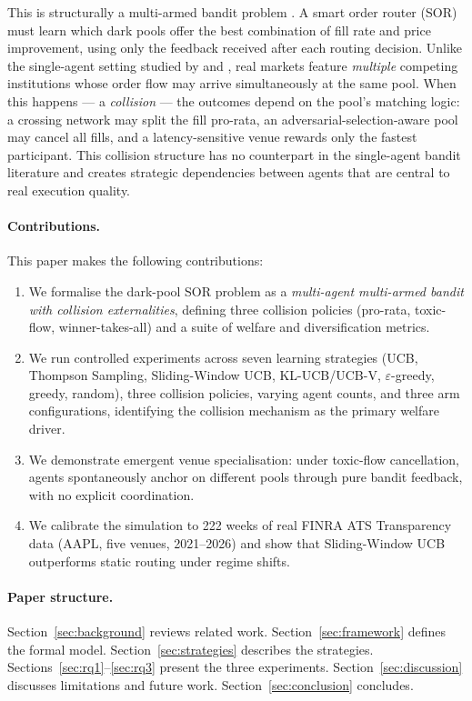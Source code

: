 \documentclass[11pt]{article}
\begin{document}
This is structurally a multi-armed bandit problem \citep{robbins1952}.
A smart order router (SOR) must learn which dark pools offer the best
combination of fill rate and price improvement, using only the feedback
received after each routing decision.
Unlike the single-agent setting studied by \citet{ganchev2010} and
\citet{bernasconi2022}, real markets feature \emph{multiple} competing
institutions whose order flow may arrive simultaneously at the same pool.
When this happens --- a \emph{collision} --- the outcomes depend on the
pool's matching logic: a crossing network may split the fill pro-rata,
an adversarial-selection-aware pool may cancel all fills, and a
latency-sensitive venue rewards only the fastest participant.
This collision structure has no counterpart in the single-agent bandit
literature and creates strategic dependencies between agents that are
central to real execution quality.

\paragraph{Contributions.} This paper makes the following contributions:
\begin{enumerate}
\item We formalise the dark-pool SOR problem as a \emph{multi-agent
  multi-armed bandit with collision externalities}, defining three
  collision policies (pro-rata, toxic-flow, winner-takes-all) and a suite
  of welfare and diversification metrics.

\item We run controlled experiments across seven learning strategies
  (UCB, Thompson Sampling, Sliding-Window UCB, KL-UCB/UCB-V,
  $\varepsilon$-greedy, greedy, random), three collision policies, varying
  agent counts, and three arm configurations, identifying the collision
  mechanism as the primary welfare driver.

\item We demonstrate emergent venue specialisation: under toxic-flow
  cancellation, agents spontaneously anchor on different pools through
  pure bandit feedback, with no explicit coordination.

\item We calibrate the simulation to 222 weeks of real FINRA ATS
  Transparency data (AAPL, five venues, 2021--2026) and show that
  Sliding-Window UCB outperforms static routing under regime shifts.
\end{enumerate}

\paragraph{Paper structure.} Section~\ref{sec:background} reviews
related work. Section~\ref{sec:framework} defines the formal model.
Section~\ref{sec:strategies} describes the strategies.
Sections~\ref{sec:rq1}--\ref{sec:rq3} present the three experiments.
Section~\ref{sec:discussion} discusses limitations and future work.
Section~\ref{sec:conclusion} concludes.
\end{document}
